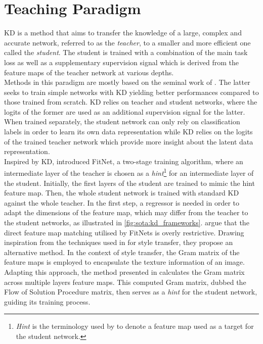\section{Teaching Paradigm}\label{sec:sota:teaching_paradigm}


\acf{KD} is a method that aims to transfer the knowledge of a large, complex and
accurate network, referred to as the \emph{teacher}, to a smaller and more
efficient one called the \emph{student}. The student is trained with a
combination of the main task loss as well as a supplementary supervision signal
which is derived from the feature maps of the teacher network at various
depths.\\

Methods in this paradigm are mostly based on the seminal work of
\citeauthor{DBLP:journals/corr/HintonVD15} \cite{DBLP:journals/corr/HintonVD15}.
The latter seeks to train simple networks with \acl{KD} yielding better
performances compared to those trained from scratch. \ac{KD} relies on teacher
and student networks, where the logits of the former are used as an additional
supervision signal for the latter. When trained separately, the student network
can only rely on classification labels in order to learn its own data
representation while \ac{KD} relies on the logits of the trained teacher network which
provide more insight about the latent data representation.\\

Inspired by \ac{KD}, \cite{DBLP:journals/corr/RomeroBKCGB14} introduced FitNet,
a two-stage training algorithm, where an intermediate layer of the teacher is
chosen as a \emph{hint}\footnote{\emph{Hint} is the terminology used by
\citeauthor{DBLP:journals/corr/RomeroBKCGB14}
\cite{DBLP:journals/corr/RomeroBKCGB14} to denote a feature map used as a target
for the student network.} for an intermediate layer of the student. Initially,
the first layers of the student are trained to mimic the hint feature map. Then,
the whole student network is trained with standard \ac{KD} against the whole
teacher. In the first step, a regressor is needed in order to adapt the
dimensions of the feature map, which may differ from the teacher to the student
networks, as illustrated in \cref{fig:sota:kd_frameworks}.
\citeauthor{DBLP:conf/cvpr/YimJBK17} argue that the direct feature map matching
utilised by FitNets is overly restrictive. Drawing inspiration from the
techniques used in \cite{DBLP:journals/corr/GatysEB15a} for style transfer, they
propose an alternative method. In the context of style transfer, the Gram matrix
of the feature maps is employed to encapsulate the texture information of an
image. Adapting this approach, the method presented in
\cite{DBLP:conf/cvpr/YimJBK17} calculates the Gram matrix across multiple layers
feature maps. This computed Gram matrix, dubbed the Flow of Solution Procedure
matrix, then serves as a \emph{hint} for the student network, guiding its
training process.\\

